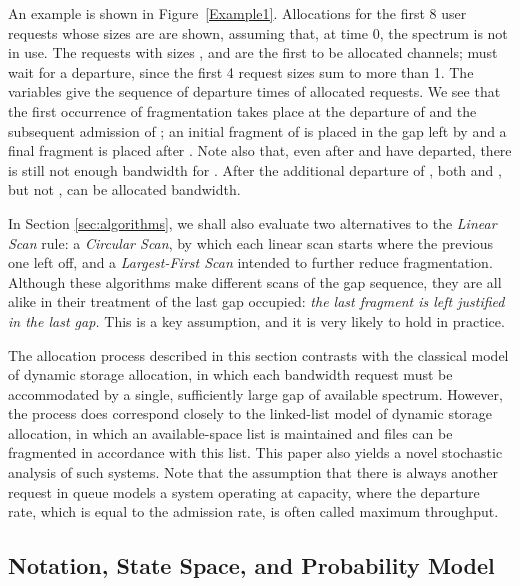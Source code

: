 \documentclass{amsart}
\begin{document}
An example is  shown in Figure~\ref{Example1}.  Allocations for the  first 8 user requests whose sizes are
 are  shown, assuming  that, at  time 0,  the spectrum  is not  in use.
The requests with sizes  , and   are the first to be allocated  channels;  must wait
for a departure, since  the first 4 request sizes sum to more than  1.  The variables  give the
sequence of  departure times of  allocated requests. We  see that the first  occurrence of
fragmentation takes place at  the departure of  and the subsequent  admission of ; an
initial fragment  of   is placed in  the gap left  by   and a final  fragment is
placed after .   Note also that, even  after  and  have  departed, there is
still not enough  bandwidth for . After the additional departure  of , both 
and , but not , can be allocated bandwidth.



In  Section \ref{sec:algorithms}, we  shall also evaluate two  alternatives to the \emph{Linear Scan} rule: a \emph{Circular Scan}, by which  each linear scan starts  where the
previous  one   left  off,  and  a  \emph{Largest-First Scan}
intended  to further reduce fragmentation.  Although these algorithms make different scans of the gap sequence,  they are all alike in their treatment of the last gap occupied: {\em  the last fragment is left justified in the last gap.}  This is a key assumption, and it is very likely to hold in practice. 

The allocation process described in this section contrasts with  the classical model of dynamic storage allocation,
in  which each bandwidth request must be accommodated by  a single,
sufficiently  large gap  of available  spectrum.   However, the  process does  correspond
closely  to   the  linked-list   model  of  dynamic   storage  allocation,  in   which  an
available-space list  is maintained and  files can be  fragmented in accordance  with this
list.  This paper also yields a novel  stochastic analysis of such systems.  Note that the
assumption that there is always another request in queue models a system operating at capacity, where the departure rate,
which is equal to the admission rate, is often called maximum throughput.

\subsection*{Notation, State Space, and Probability Model}
\end{document}
